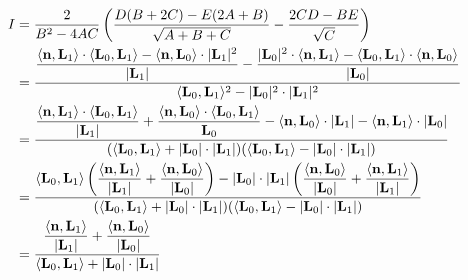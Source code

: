 \begin{align*}
I &= \frac{2}{B^2-4AC}\left(\frac{D(B + 2C) - E(2A+B)}{\sqrt{A+B+C}} - \frac{2CD - BE}{\sqrt{C}}\right)\\
&= \frac{ \dfrac{\langle\bold{n},\bold{L}_1\rangle\cdot\langle\bold{L}_0,\bold{L}_1\rangle - \langle\bold{n},\bold{L}_0\rangle\cdot|\bold{L}_1|^2}{|\bold{L}_1|} - \dfrac{|\bold{L}_0|^2\cdot\langle\bold{n},\bold{L}_1\rangle - \langle\bold{L}_0,\bold{L}_1\rangle\cdot\langle\bold{n},\bold{L}_0\rangle}{|\bold{L}_0|} }{\langle\bold{L}_0,\bold{L}_1\rangle^2-|\bold{L}_0|^2\cdot|\bold{L}_1|^2}\\
&= \frac{  \dfrac{\langle\bold{n},\bold{L}_1\rangle\cdot\langle\bold{L}_0,\bold{L}_1\rangle}{|\bold{L}_1|} + \dfrac{\langle\bold{n},\bold{L}_0\rangle\cdot\langle\bold{L}_0,\bold{L}_1\rangle}{\bold{L}_0} - \langle\bold{n},\bold{L}_0\rangle\cdot|\bold{L}_1| - \langle\bold{n},\bold{L}_1\rangle\cdot|\bold{L}_0|}{(\langle\bold{L}_0,\bold{L}_1\rangle+|\bold{L}_0|\cdot|\bold{L}_1|)(\langle\bold{L}_0,\bold{L}_1\rangle-|\bold{L}_0|\cdot|\bold{L}_1|)} \\
&= \frac{\langle\bold{L}_0,\bold{L}_1\rangle\left(\dfrac{\langle\bold{n},\bold{L}_1\rangle}{|\bold{L}_1|}+\dfrac{\langle\bold{n},\bold{L}_0\rangle}{|\bold{L}_0|}\right) - |\bold{L}_0|\cdot|\bold{L}_1|\left(\dfrac{\langle\bold{n},\bold{L}_0\rangle}{|\bold{L}_0|}+\dfrac{\langle\bold{n},\bold{L}_1\rangle}{|\bold{L}_1|}\right)}{(\langle\bold{L}_0,\bold{L}_1\rangle+|\bold{L}_0|\cdot|\bold{L}_1|)(\langle\bold{L}_0,\bold{L}_1\rangle-|\bold{L}_0|\cdot|\bold{L}_1|)} \\
&= \frac{\dfrac{\langle\bold{n},\bold{L}_1\rangle}{|\bold{L}_1|}+\dfrac{\langle\bold{n},\bold{L}_0\rangle}{|\bold{L}_0|} }{\langle\bold{L}_0,\bold{L}_1\rangle + |\bold{L}_0|\cdot|\bold{L}_1|}
\end{align*}









